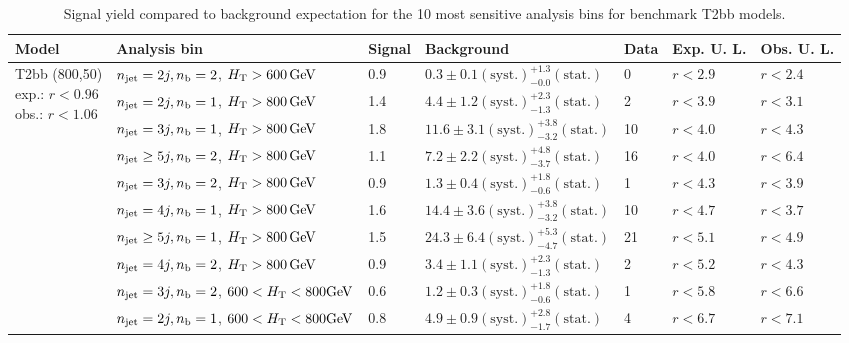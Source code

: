 \begin{table}[h!] 
  \scriptsize
  \caption{ 
Signal yield compared to background expectation for the 10 most sensitive analysis bins 
for benchmark T2bb models.
  \label{tab:sigBenchmarksYields_T2bb}}
  \centering 
  \begin{tabular}{ lllllll } 
    \hline 
    \hline 
    Model & Analysis bin & Signal & Background & Data & Exp. U. L. & Obs. U. L. \\ \hline
\multirow{10}{*}{\parbox[t]{2cm}{T2bb (800,50)\\exp.: $r<0.96$\\obs.: $r<1.06$}}
 & $n_{\mathrm{jet}} =2j,n_{\text{b}} =2$, $\mbox{$H_\text{T}$} > 600 \, \mathrm{GeV}$ & 0.9 & $0.3 \pm 0.1 \mathrm{(syst.)} ^{+1.3}_{-0.0} \mathrm{(stat.)}$ & 0 & $r < 2.9$ & $r < 2.4$\\ 
 & $n_{\mathrm{jet}} =2j,n_{\text{b}} =1$, $\mbox{$H_\text{T}$} > 800 \, \mathrm{GeV}$ & 1.4 & $4.4 \pm 1.2 \mathrm{(syst.)} ^{+2.3}_{-1.3} \mathrm{(stat.)}$ & 2 & $r < 3.9$ & $r < 3.1$\\ 
 & $n_{\mathrm{jet}} =3j,n_{\text{b}} =1$, $\mbox{$H_\text{T}$} > 800 \, \mathrm{GeV}$ & 1.8 & $11.6 \pm 3.1 \mathrm{(syst.)} ^{+3.8}_{-3.2} \mathrm{(stat.)}$ & 10 & $r < 4.0$ & $r < 4.3$\\ 
 & $n_{\mathrm{jet}} \geq5j,n_{\text{b}} =2$, $\mbox{$H_\text{T}$} > 800 \, \mathrm{GeV}$ & 1.1 & $7.2 \pm 2.2 \mathrm{(syst.)} ^{+4.8}_{-3.7} \mathrm{(stat.)}$ & 16 & $r < 4.0$ & $r < 6.4$\\ 
 & $n_{\mathrm{jet}} =3j,n_{\text{b}} =2$, $\mbox{$H_\text{T}$} > 800 \, \mathrm{GeV}$ & 0.9 & $1.3 \pm 0.4 \mathrm{(syst.)} ^{+1.8}_{-0.6} \mathrm{(stat.)}$ & 1 & $r < 4.3$ & $r < 3.9$\\ 
 & $n_{\mathrm{jet}} =4j,n_{\text{b}} =1$, $\mbox{$H_\text{T}$} > 800 \, \mathrm{GeV}$ & 1.6 & $14.4 \pm 3.6 \mathrm{(syst.)} ^{+3.8}_{-3.2} \mathrm{(stat.)}$ & 10 & $r < 4.7$ & $r < 3.7$\\ 
 & $n_{\mathrm{jet}} \geq5j,n_{\text{b}} =1$, $\mbox{$H_\text{T}$} > 800 \, \mathrm{GeV}$ & 1.5 & $24.3 \pm 6.4 \mathrm{(syst.)} ^{+5.3}_{-4.7} \mathrm{(stat.)}$ & 21 & $r < 5.1$ & $r < 4.9$\\ 
 & $n_{\mathrm{jet}} =4j,n_{\text{b}} =2$, $\mbox{$H_\text{T}$} > 800 \, \mathrm{GeV}$ & 0.9 & $3.4 \pm 1.1 \mathrm{(syst.)} ^{+2.3}_{-1.3} \mathrm{(stat.)}$ & 2 & $r < 5.2$ & $r < 4.3$\\ 
 & $n_{\mathrm{jet}} =3j,n_{\text{b}} =2$, $600 < \mbox{$H_\text{T}$} < 800 \mathrm{GeV}$ & 0.6 & $1.2 \pm 0.3 \mathrm{(syst.)} ^{+1.8}_{-0.6} \mathrm{(stat.)}$ & 1 & $r < 5.8$ & $r < 6.6$\\ 
 & $n_{\mathrm{jet}} =2j,n_{\text{b}} =1$, $600 < \mbox{$H_\text{T}$} < 800 \mathrm{GeV}$ & 0.8 & $4.9 \pm 0.9 \mathrm{(syst.)} ^{+2.8}_{-1.7} \mathrm{(stat.)}$ & 4 & $r < 6.7$ & $r < 7.1$\\ \hline

\end{tabular}
\end{table}
